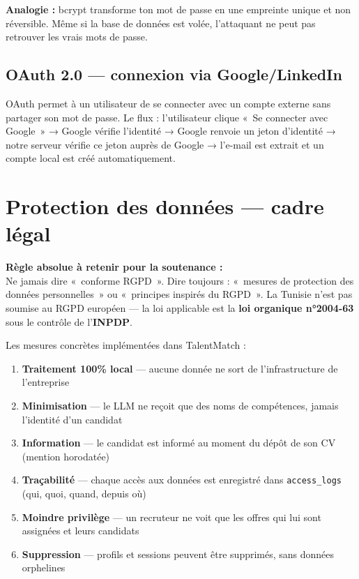 \documentclass[12pt,a4paper]{article}
\newenvironment{boite}{%
  \def\FrameCommand{\fboxsep=8pt\colorbox{bleulight}}%
  \MakeFramed{\advance\hsize-\width \FrameRestore}%
  \vspace{-4pt}%
}{\endMakeFramed}
\newenvironment{simplification}{%
  \def\FrameCommand{\fboxsep=8pt\colorbox{green!10}}%
  \MakeFramed{\advance\hsize-\width \FrameRestore}%
  \vspace{-4pt}%
}{\endMakeFramed}
\newcommand{\tech}[1]{\texttt{#1}}
\newcommand{\important}[1]{\textbf{\color{rouge}#1}}
\begin{document}
\begin{simplification}
\textbf{Analogie :} bcrypt transforme ton mot de passe en une empreinte unique et non réversible. Même si la base de données est volée, l'attaquant ne peut pas retrouver les vrais mots de passe.
\end{simplification}

\subsection{OAuth 2.0 — connexion via Google/LinkedIn}

OAuth permet à un utilisateur de se connecter avec un compte externe sans partager son mot de passe. Le flux : l'utilisateur clique «~Se connecter avec Google~» → Google vérifie l'identité → Google renvoie un jeton d'identité → notre serveur vérifie ce jeton auprès de Google → l'e-mail est extrait et un compte local est créé automatiquement.

\newpage

\section{Protection des données — cadre légal}

\begin{boite}
\important{Règle absolue à retenir pour la soutenance :}\\
Ne jamais dire «~conforme RGPD~». Dire toujours : «~mesures de protection des données personnelles~» ou «~principes inspirés du RGPD~». La Tunisie n'est pas soumise au RGPD européen — la loi applicable est la \textbf{loi organique n°2004-63} sous le contrôle de l'\textbf{INPDP}.
\end{boite}

\medskip

Les mesures concrètes implémentées dans TalentMatch :

\begin{enumerate}
  \item \textbf{Traitement 100\% local} — aucune donnée ne sort de l'infrastructure de l'entreprise
  \item \textbf{Minimisation} — le LLM ne reçoit que des noms de compétences, jamais l'identité d'un candidat
  \item \textbf{Information} — le candidat est informé au moment du dépôt de son CV (mention horodatée)
  \item \textbf{Traçabilité} — chaque accès aux données est enregistré dans \tech{access\_logs} (qui, quoi, quand, depuis où)
  \item \textbf{Moindre privilège} — un recruteur ne voit que les offres qui lui sont assignées et leurs candidats
  \item \textbf{Suppression} — profils et sessions peuvent être supprimés, sans données orphelines
\end{enumerate}
\end{document}
